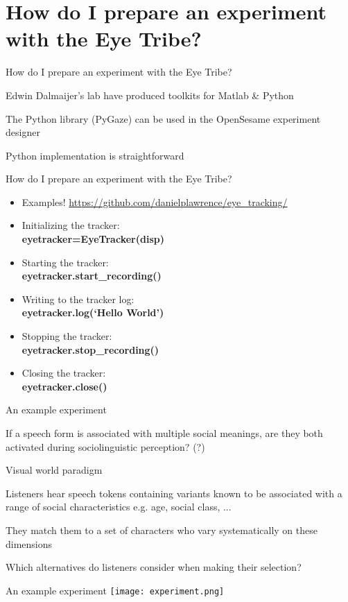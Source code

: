 \documentclass[unknownkeysallowed]{beamer}
\newenvironment{itemize*}%
  {\begin{itemize}%
    \setlength{\itemsep}{15pt}%
    \setlength{\parskip}{0pt}}%
  {\end{itemize}}
\begin{document}
\section{How do I prepare an experiment with the Eye Tribe?}
\begin{frame}{How do I prepare an experiment with the Eye Tribe?}
\begin{itemize*}
\item{Edwin Dalmaijer's lab have produced toolkits for Matlab \& Python}
\item{The Python library (PyGaze) can be used in the OpenSesame experiment designer}
\item{Python implementation is straightforward}
\end{itemize*}
\end{frame}
\begin{frame}{How do I prepare an experiment with the Eye Tribe?}
\begin{itemize}
\item{Examples! \url{https://github.com/danielplawrence/eye_tracking/}}
\item{Initializing the tracker:\\ \textbf{eyetracker=EyeTracker(disp)}}
\item{Starting the tracker:\\ \textbf{eyetracker.start\_recording()}}
\item{Writing to the tracker log:\\ \textbf{eyetracker.log(`Hello World')}}
\item{Stopping the tracker:\\ \textbf{eyetracker.stop\_recording()}}
\item{Closing the tracker:\\ \textbf{eyetracker.close()}}
\end{itemize}
\end{frame}
\begin{frame}{An example experiment}
\begin{itemize*}
\item{If a speech form is associated with multiple social meanings, are they both activated during sociolinguistic perception? (?)}
\item{Visual world paradigm}
\item{Listeners hear speech tokens containing variants known to be associated with a range of social characteristics e.g. age, social class, ...}
\item{They match them to a set of characters who vary systematically on these dimensions}
\item{Which alternatives do listeners consider when making their selection?}
\end{itemize*}
\end{frame}
\begin{frame}{An example experiment}
\center
\texttt{[image: experiment.png]}
\end{frame}
\end{document}
